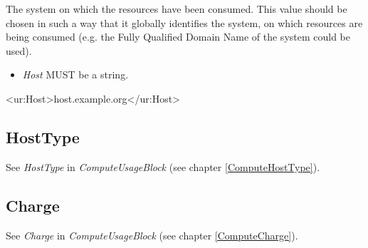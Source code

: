 The system on which the resources have been consumed. This value should be chosen in such a way that it globally identifies the system, on which resources are being consumed (e.g. the Fully Qualified Domain Name of the system could be used). 

\begin{itemize}
\item \emph{Host} MUST be a string. 
\end{itemize}

\begin{XMLexample}
<ur:Host>host.example.org</ur:Host>
\end{XMLexample}





\subsection{HostType}

See \emph{HostType} in \emph{ComputeUsageBlock} (see chapter \ref{ComputeHostType}).






\subsection{Charge}

See \emph{Charge} in \emph{ComputeUsageBlock} (see chapter \ref{ComputeCharge}).

